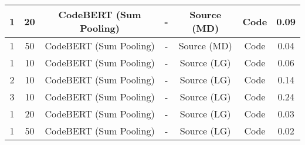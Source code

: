 \begin{longtable}{|c|c|c|c|c|c|c|}
\hline
1 & 20 & CodeBERT (Sum Pooling) & - & Source (MD) & Code & 0.09 \\
\hline
1 & 50 & CodeBERT (Sum Pooling) & - & Source (MD) & Code & 0.04 \\
\hline
1 & 10 & CodeBERT (Sum Pooling) & - & Source (LG) & Code & 0.06 \\
\hline
2 & 10 & CodeBERT (Sum Pooling) & - & Source (LG) & Code & 0.14 \\
\hline
3 & 10 & CodeBERT (Sum Pooling) & - & Source (LG) & Code & 0.24 \\
\hline
1 & 20 & CodeBERT (Sum Pooling) & - & Source (LG) & Code & 0.03 \\
\hline
1 & 50 & CodeBERT (Sum Pooling) & - & Source (LG) & Code & 0.02 \\
\hline
\end{longtable}
